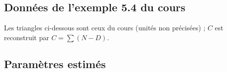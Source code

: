 \documentclass[11pt,a4paper]{article}
\begin{document}
\subsection*{Données de l'exemple 5.4 du cours}
Les triangles ci-dessous sont ceux du cours (unités non précisées) ; $C$ est reconstruit par $C=\sum(N-D)$.
\begin{table}[H]\centering\scriptsize\setlength{\tabcolsep}{4pt}
\tabSchnieperExposition
\caption{Expositions $E_i$ de l'exemple 5.4.}
\end{table}
\begin{center}\scriptsize\setlength{\tabcolsep}{4pt}
\begin{minipage}[t]{.48\linewidth}\centering \tabSchnieperN {}\end{minipage}\hfill
\begin{minipage}[t]{.48\linewidth}\centering \tabSchnieperD {}\end{minipage}
\end{center}
\begin{table}[H]\centering\scriptsize\setlength{\tabcolsep}{4pt}
\tabSchnieperC
\caption{Cumul observé $C_{i,j}=\sum_{k\le j}(N_{i,k}-D_{i,k})$.}
\end{table}

\subsection*{Paramètres estimés}
\begin{table}[H]\centering\small
\tabSchnieperParams
\caption{Paramètres de l'exemple 5.4. $\widehat\lambda_j$ est un taux par unité d'exposition ; $\widehat\delta_j<0$ signifie des révisions en moyenne à la hausse. La dernière ligne de $\widehat\sigma$ et la dernière valeur de $\widehat\tau$ valent 0 par convention.}
\end{table}
\end{document}
